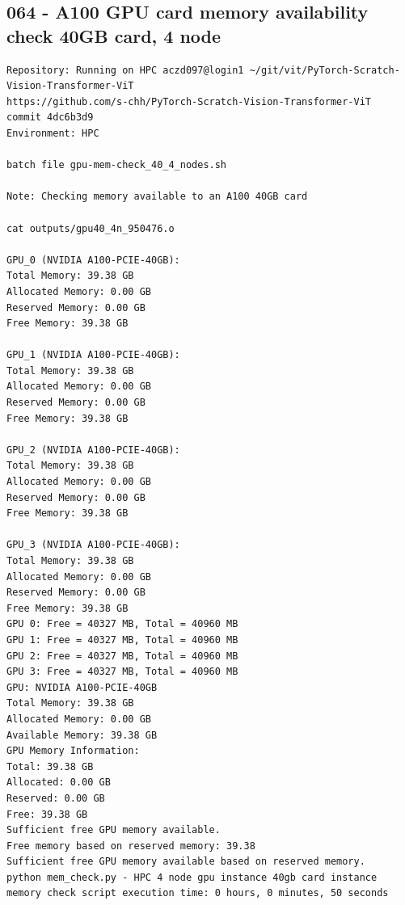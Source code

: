 \subsection{064 - A100 GPU card memory availability check 40GB card, 4 node}
\label{app_res:064}
\begin{verbatim}
Repository: Running on HPC aczd097@login1 ~/git/vit/PyTorch-Scratch-Vision-Transformer-ViT
https://github.com/s-chh/PyTorch-Scratch-Vision-Transformer-ViT
commit 4dc6b3d9
Environment: HPC

batch file gpu-mem-check_40_4_nodes.sh

Note: Checking memory available to an A100 40GB card 

cat outputs/gpu40_4n_950476.o

GPU_0 (NVIDIA A100-PCIE-40GB):
Total Memory: 39.38 GB
Allocated Memory: 0.00 GB
Reserved Memory: 0.00 GB
Free Memory: 39.38 GB

GPU_1 (NVIDIA A100-PCIE-40GB):
Total Memory: 39.38 GB
Allocated Memory: 0.00 GB
Reserved Memory: 0.00 GB
Free Memory: 39.38 GB

GPU_2 (NVIDIA A100-PCIE-40GB):
Total Memory: 39.38 GB
Allocated Memory: 0.00 GB
Reserved Memory: 0.00 GB
Free Memory: 39.38 GB

GPU_3 (NVIDIA A100-PCIE-40GB):
Total Memory: 39.38 GB
Allocated Memory: 0.00 GB
Reserved Memory: 0.00 GB
Free Memory: 39.38 GB
GPU 0: Free = 40327 MB, Total = 40960 MB
GPU 1: Free = 40327 MB, Total = 40960 MB
GPU 2: Free = 40327 MB, Total = 40960 MB
GPU 3: Free = 40327 MB, Total = 40960 MB
GPU: NVIDIA A100-PCIE-40GB
Total Memory: 39.38 GB
Allocated Memory: 0.00 GB
Available Memory: 39.38 GB
GPU Memory Information:
Total: 39.38 GB
Allocated: 0.00 GB
Reserved: 0.00 GB
Free: 39.38 GB
Sufficient free GPU memory available.
Free memory based on reserved memory: 39.38
Sufficient free GPU memory available based on reserved memory.
python mem_check.py - HPC 4 node gpu instance 40gb card instance memory check script execution time: 0 hours, 0 minutes, 50 seconds
            
\end{verbatim}

